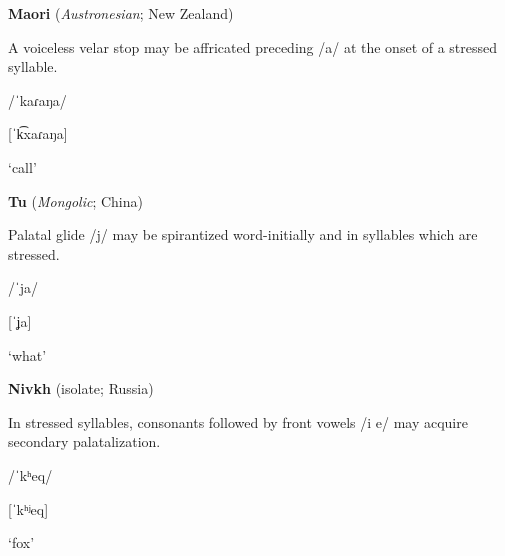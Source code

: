 \ea\label{ex:(5.22)}
  \textbf{Maori} (\textit{Austronesian}; New Zealand)



A voiceless velar stop may be affricated preceding /a/ at the onset of a stressed syllable.



/ˈkaɾaŋa/



[ˈk͡xaɾaŋa]



‘call’



\citep[521-2]{Bauer1999}


\z

\ea\label{ex:(5.23)}
  \textbf{Tu} (\textit{Mongolic}; China)



Palatal glide /j/ may be spirantized word-initially and in syllables which are stressed.



/ˈja/



[ˈʝa]



‘what’



\citep[31-2]{Slater2003}
\z



\ea\label{ex:(5.24)}
  \textbf{Nivkh} (isolate; Russia)



In stressed syllables, consonants followed by front vowels /i e/ may acquire secondary palatalization.



/ˈkʰeq/



[ˈkʰʲeq]



‘fox’



\citep[23]{Shiraishi2006}
\z



